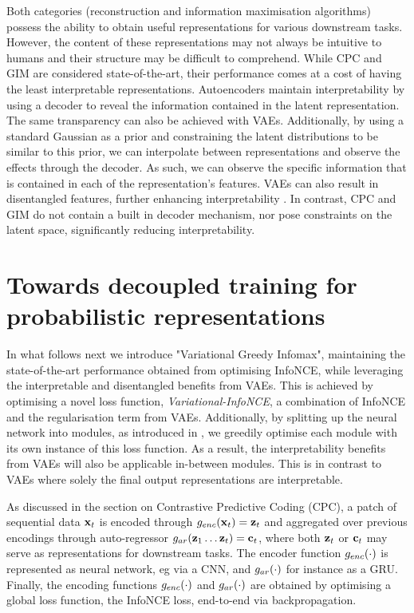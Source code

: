 		Both categories (reconstruction and information maximisation algorithms) possess the ability to obtain useful representations for various downstream tasks. However, the content of these representations may not always be intuitive to humans and their structure may be difficult to comprehend. While CPC and GIM are considered state-of-the-art, their performance comes at a cost of having the least interpretable representations. Autoencoders maintain interpretability by using a decoder to reveal the information contained in the latent representation. The same transparency can also be achieved with VAEs. Additionally, by using a standard Gaussian as a prior and constraining the latent distributions to be similar to this prior, we can interpolate between representations and observe the effects through the decoder. As such, we can observe the specific information that is contained in each of the representation's features. VAEs can also result in disentangled features, further enhancing interpretability \cite{grossuttiDeepLearningInfrared2022}. In contrast, CPC and GIM do not contain a built in decoder mechanism, nor pose constraints on the latent space, significantly reducing interpretability.
		


\section{Towards decoupled training for probabilistic representations}
		In what follows next we introduce "Variational Greedy Infomax", maintaining the state-of-the-art performance obtained from optimising InfoNCE, while leveraging the interpretable and disentangled benefits from VAEs. This is achieved by optimising a novel loss function, \textit{Variational-InfoNCE}, a combination of InfoNCE and the regularisation term from VAEs. Additionally, by splitting up the neural network into modules, as introduced in \cite{lowePuttingEndEndtoEnd2020}, we greedily optimise each module with its own instance of this loss function. As a result, the interpretability benefits from VAEs will also be applicable in-between modules. This is in contrast to VAEs where solely the final output representations are interpretable.		
				
		
		As discussed in the section on Contrastive Predictive Coding (CPC), a patch of sequential data $\mathbf{x}_t$ is encoded through $g_{enc}(\mathbf{x}_t) = \mathbf{z}_t$ and aggregated over previous encodings through auto-regressor $g_{ar}(\mathbf{z}_1  \dots \mathbf{z}_t) = \mathbf{c}_t$, where both $\mathbf{z}_t$ or $\mathbf{c}_t$ may serve as representations for downstream tasks. The encoder function $g_{enc}(\cdot)$ is represented as neural network, eg via a CNN, and $g_{ar}(\cdot)$ for instance as a GRU. %
		Finally, the encoding functions $g_{enc}(\cdot)$ and $g_{ar}(\cdot)$ are obtained by optimising a global loss function, the InfoNCE loss, end-to-end via backpropagation. 

